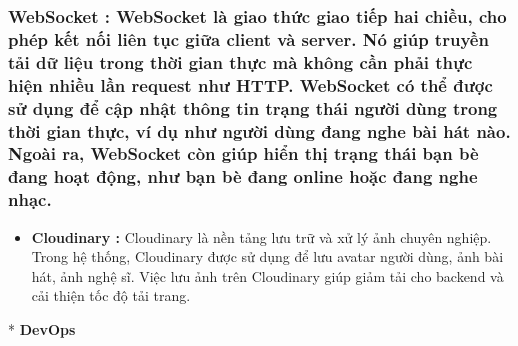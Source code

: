 \documentclass{article}
\begin{document}
\subsubsection{\texorpdfstring{\textbf{WebSocket :} WebSocket là giao
thức giao tiếp hai chiều, cho phép kết nối liên tục giữa client và
server. Nó giúp truyền tải dữ liệu trong thời gian thực mà không cần
phải thực hiện nhiều lần request như HTTP. WebSocket có thể được sử dụng
để cập nhật thông tin trạng thái người dùng trong thời gian thực, ví dụ
như người dùng đang nghe bài hát nào. Ngoài ra, WebSocket còn giúp hiển
thị trạng thái bạn bè đang hoạt động, như bạn bè đang online hoặc đang
nghe
nhạc.}{WebSocket : WebSocket là giao thức giao tiếp hai chiều, cho phép kết nối liên tục giữa client và server. Nó giúp truyền tải dữ liệu trong thời gian thực mà không cần phải thực hiện nhiều lần request như HTTP. WebSocket có thể được sử dụng để cập nhật thông tin trạng thái người dùng trong thời gian thực, ví dụ như người dùng đang nghe bài hát nào. Ngoài ra, WebSocket còn giúp hiển thị trạng thái bạn bè đang hoạt động, như bạn bè đang online hoặc đang nghe nhạc.}}\label{websocket-websocket-luxe0-giao-thux1ee9c-giao-tiux1ebfp-hai-chiux1ec1u-cho-phuxe9p-kux1ebft-nux1ed1i-liuxean-tux1ee5c-giux1eefa-client-vuxe0-server.-nuxf3-giuxfap-truyux1ec1n-tux1ea3i-dux1eef-liux1ec7u-trong-thux1eddi-gian-thux1ef1c-muxe0-khuxf4ng-cux1ea7n-phux1ea3i-thux1ef1c-hiux1ec7n-nhiux1ec1u-lux1ea7n-request-nhux1b0-http.-websocket-cuxf3-thux1ec3-ux111ux1b0ux1ee3c-sux1eed-dux1ee5ng-ux111ux1ec3-cux1eadp-nhux1eadt-thuxf4ng-tin-trux1ea1ng-thuxe1i-ngux1b0ux1eddi-duxf9ng-trong-thux1eddi-gian-thux1ef1c-vuxed-dux1ee5-nhux1b0-ngux1b0ux1eddi-duxf9ng-ux111ang-nghe-buxe0i-huxe1t-nuxe0o.-ngouxe0i-ra-websocket-cuxf2n-giuxfap-hiux1ec3n-thux1ecb-trux1ea1ng-thuxe1i-bux1ea1n-buxe8-ux111ang-houx1ea1t-ux111ux1ed9ng-nhux1b0-bux1ea1n-buxe8-ux111ang-online-houx1eb7c-ux111ang-nghe-nhux1ea1c.}

\begin{itemize}
\item
  \textbf{Cloudinary :} Cloudinary là nền tảng lưu trữ và xử lý ảnh
  chuyên nghiệp. Trong hệ thống, Cloudinary được sử dụng để lưu avatar
  người dùng, ảnh bài hát, ảnh nghệ sĩ. Việc lưu ảnh trên Cloudinary
  giúp giảm tải cho backend và cải thiện tốc độ tải trang.
\end{itemize}

* \textbf{DevOps}
\end{document}
